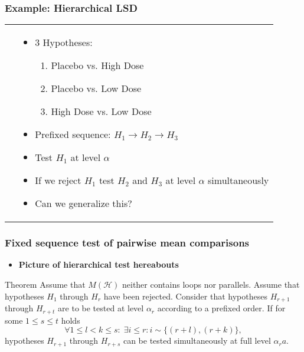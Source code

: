 \documentclass[bigger]{beamer}
\begin{document}
\begin{frame}
 \frametitle{Example: Hierarchical LSD}
\begin{tabular}{ll}
 \begin{minipage}{.4\textwidth}
   
 \end{minipage} &
 \begin{minipage}{.6\textwidth}
   \begin{itemize}
   \item 3 Hypotheses:
     \begin{enumerate}
     \item Placebo vs. High Dose
     \item Placebo vs. Low Dose
     \item High Dose vs. Low Dose
     \end{enumerate}
   \item Prefixed sequence: $H_1 \rightarrow H_2 \rightarrow H_3$
   \item Test $H_1$ at level $\alpha$
   \item If we reject $H_1$ test $H_2$ and $H_3$ at level $\alpha$
     simultaneously
   \item Can we generalize this?
   \end{itemize}
 \end{minipage}
\end{tabular}

\end{frame}

\begin{frame}
 \frametitle{Fixed sequence test of pairwise mean comparisons}
\begin{itemize}
\item {\bf Picture of hierarchical test hereabouts}
\end{itemize}

\begin{block}{Theorem}
 Assume that $M(\mathscr{H})$ neither contains loops nor
 parallels. Assume that hypotheses $H_1$ through $H_r$ have been
 rejected. Consider that hypotheses $H_{r+1}$ through $H_{r+t}$ are
 to be tested at level $\alpha_r$ according to a prefixed order.  If
 for some $1 \leq s \leq t$ holds
 \begin{equation}
   \label{eq:cond.hierarchical}
   \forall 1 \leq l < k \leq s: \; \exists i \leq r: i \sim \{(r+l),(r+k)\},
 \end{equation}
 hypotheses $H_{r+1}$ through $H_{r+s}$ can be tested simultaneously
 at full level $\alpha_ra$.
\end{block}

\end{frame}
\end{document}
